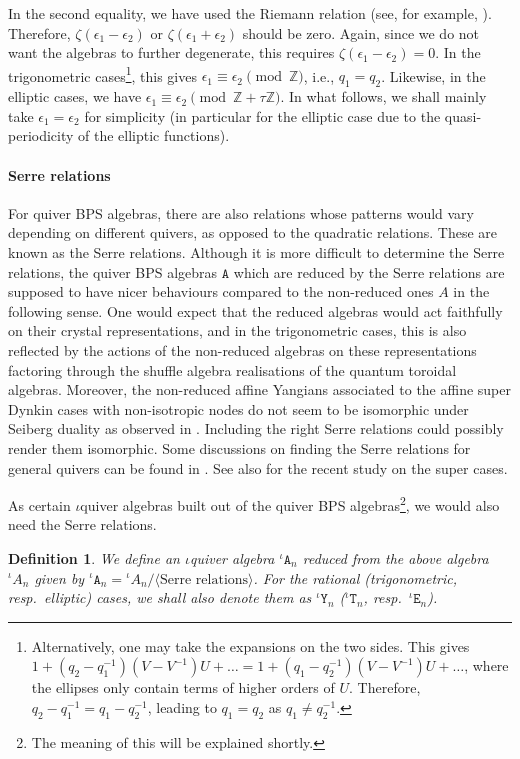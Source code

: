 \documentclass[11pt]{article}
\numberwithin{equation}{section}
\numberwithin{figure}{section}
\numberwithin{table}{section}
\newtheorem{definition}{Definition}[section]
\begin{document}
\begin{itemize}
	In the second equality, we have used the Riemann relation (see, for example, \cite[(29)]{kajiwara2004point}). Therefore, $\zeta(\epsilon_1-\epsilon_2)$ or $\zeta(\epsilon_1+\epsilon_2)$ should be zero. Again, since we do not want the algebras to further degenerate, this requires $\zeta(\epsilon_1-\epsilon_2)=0$. In the trigonometric cases\footnote{Alternatively, one may take the expansions on the two sides. This gives $1+\left(q_2-q_1^{-1}\right)\left(V-V^{-1}\right)U+\dots=1+\left(q_1-q_2^{-1}\right)\left(V-V^{-1}\right)U+\dots$, where the ellipses only contain terms of higher orders of $U$. Therefore, $q_2-q_1^{-1}=q_1-q_2^{-1}$, leading to $q_1=q_2$ as $q_1\neq q_2^{-1}$.}, this gives $\epsilon_1\equiv\epsilon_2\pmod{\mathbb{Z}}$, i.e., $q_1=q_2$. Likewise, in the elliptic cases, we have $\epsilon_1\equiv\epsilon_2\pmod{\mathbb{Z}+\tau\mathbb{Z}}$. In what follows, we shall mainly take $\epsilon_1=\epsilon_2$ for simplicity (in particular for the elliptic case due to the quasi-periodicity of the elliptic functions).
\end{itemize}

\paragraph{Serre relations} For quiver BPS algebras, there are also relations whose patterns would vary depending on different quivers, as opposed to the quadratic relations. These are known as the Serre relations. Although it is more difficult to determine the Serre relations, the quiver BPS algebras $\mathtt{A}$ which are reduced by the Serre relations are supposed to have nicer behaviours compared to the non-reduced ones $A$ in the following sense. One would expect that the reduced algebras would act faithfully on their crystal representations, and in the trigonometric cases, this is also reflected by the actions of the non-reduced algebras on these representations factoring through the shuffle algebra realisations of the quantum toroidal algebras. Moreover, the non-reduced affine Yangians associated to the affine super Dynkin cases with non-isotropic nodes do not seem to be isomorphic under Seiberg duality as observed in \cite{Bao:2023ece}. Including the right Serre relations could possibly render them isomorphic. Some discussions on finding the Serre relations for general quivers can be found in \cite{Galakhov:2021vbo,Negut:2023iia}. See also \cite{Negut:2026lzn,Negut:2026ugx} for the recent study on the super cases.

As certain $\iota$quiver algebras built out of the quiver BPS algebras\footnote{The meaning of this will be explained shortly.}, we would also need the Serre relations.
\begin{definition}
	We define an $\iota$quiver algebra ${}^\iota\mathtt{A}_n$ reduced from the above algebra ${}^\iota A_n$ given by ${}^\iota\mathtt{A}_n={}^\iota A_n/\langle\text{Serre relations}\rangle$. For the rational (trigonometric, resp.~elliptic) cases, we shall also denote them as ${}^\iota\mathtt{Y}_n$ (${}^\iota\mathtt{T}_n$, resp.~${}^\iota\mathtt{E}_n$).
\end{definition}
\end{document}
